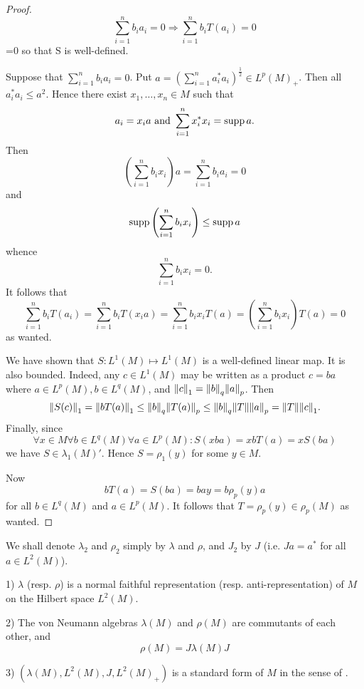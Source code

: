 \begin{proof}
    \begin{equation}
        \sum_{i=1}^nb_ia_i=0\Rightarrow \sum_{i=1}^nb_iT(a_i)=0
    \end{equation}
    {\color{red} =0} so that S is well-defined.\par
    Suppose that $\sum_{i=1}^nb_ia_i=0$. Put $a=\left( \sum_{i=1}^na_i^*a_i \right)^\frac{1}{2} \in L^p(M)_+$. Then all $a_i^*a_i\leq a^2$. Hence there exist $x_1,\dots,x_n\in M$ such that
    \[
        a_i=x_ia \text{ and }\sum_{i=1}^n x_i^*x_i=\operatorname{supp} a.
    \]
    Then
    \[
        \left( \sum_{i=1}^nb_ix_i \right)a= \sum_{i=1}^nb_ia_i =0
    \]
    and
    \[
        \operatorname{supp}\left( \sum_{i=1}^nb_ix_i \right) \leq \operatorname{supp} a
    \]
    whence
    \[
        \sum_{i=1}^nb_ix_i=0.
    \]
    It follows that
    \[
        \sum_{i=1}^nb_iT(a_i)=\sum_{i=1}^nb_iT(x_ia)=\sum_{i=1}^nb_ix_iT(a)=\left( \sum_{i=1}^nb_ix_i \right)T(a)=0
    \]
    as wanted.\par
    We have shown that $S:L^1(M) \mapsto L^1(M)$ is a well-defined linear map. It is also bounded. Indeed, any $c\in L^1(M)$ may be written as a product $c = ba$ where $a\in L^p(M),  b\in  L^q(M)$, and $\norm{c}_1=\norm{b}_q\norm{a}_p$. Then
    \[
        \norm{S(c)}_1=\norm{bT(a)}_1\leq \norm{b}_q\norm{T(a)}_p\leq\norm{b}_q\norm{T}\norm{a}_p=\norm{T}\norm{c}_1.
    \]
    Finally, since
    \[
        \forall x\in M \forall b\in  L^q(M) \forall a\in L^p(M): S(xba) = xb T(a) = x S(ba)
    \]
    we have $S\in \lambda_1(M)'$. Hence $S=\rho_1(y)$ for some $y\in M$.\par
    Now
    \[
        b T(a)=S(ba) =bay= b \rho_p(y)a
    \]
    for all $b\in L^q(M)$ and $a\in L^p(M)$. It follows that $T=\rho_p(y)\in \rho_p(M)$ as wanted.
\end{proof}
We shall denote $\lambda_2$ and $\rho_2$ simply by $\lambda$ and $\rho$, and $J_2$ by $J$ (i.e. $Ja=a^*$ for all $a\in L^2(M)$).
\begin{theorem}
    1) $\lambda$ (resp. $\rho$) is a normal faithful representation (resp. anti-representation) of $M$ on the Hilbert space $L^2(M)$.\par
    2) The von Neumann algebras $\lambda(M)$ and $\rho(M)$ are commutants of each other, and
    \[
        \rho(M)=J\lambda(M)J
    \]\par
    3) $(\lambda(M),L^2(M),J,L^2(M)_+)$ is a standard form of $M$ in the sense of \cite[Definition 2.1]{4}.
\end{theorem}
